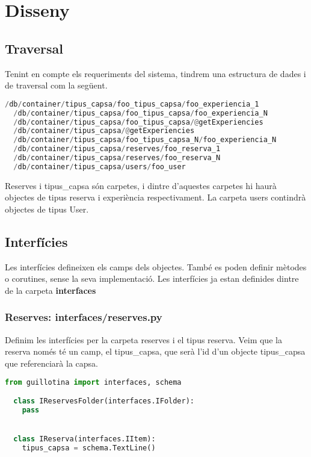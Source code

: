 \documentclass[a4paper, 11pt]{article}
\begin{document}
\pagebreak
\section{Disseny}
\subsection{Traversal} 
Tenint en compte els requeriments del sistema, tindrem una estructura
de dades i de traversal com la següent.
\begin{lstlisting}[language=Python, caption=Estructura dades]
  /db/container/tipus_capsa/foo_tipus_capsa/foo_experiencia_1
  /db/container/tipus_capsa/foo_tipus_capsa/foo_experiencia_N
  /db/container/tipus_capsa/foo_tipus_capsa/@getExperiencies
  /db/container/tipus_capsa/@getExperiencies
  /db/container/tipus_capsa/foo_tipus_capsa_N/foo_experiencia_N
  /db/container/tipus_capsa/reserves/foo_reserva_1
  /db/container/tipus_capsa/reserves/foo_reserva_N
  /db/container/tipus_capsa/users/foo_user
\end{lstlisting}

Reserves i tipus\_capsa són carpetes, i dintre d'aquestes carpetes hi
haurà objectes de tipus reserva i experiència respectivament. La
carpeta users contindrà objectes de tipus User.

\subsection{Interfícies}
Les interfícies defineixen els camps dels objectes. També es poden
definir mètodes o corutines, sense la seva implementació. Les
interfícies ja estan definides dintre de la carpeta
\textbf{interfaces}

\subsubsection{Reserves: interfaces/reserves.py}
Definim les interfícies per la carpeta reserves i el tipus
reserva. Veim que la reserva només té un camp, el tipus\_capsa, que
serà l'id d'un objecte tipus\_capsa que referenciarà la capsa.
\begin{lstlisting}[language=Python, caption=Estructura dades]
  from guillotina import interfaces, schema

  class IReservesFolder(interfaces.IFolder):
    pass


  class IReserva(interfaces.IItem):
    tipus_capsa = schema.TextLine()
  \end{lstlisting}
\end{document}
